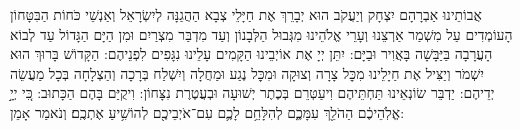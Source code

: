 \documentclass[a4paper, twoside, openany, parskip=half, 11pt]{article}
\begin{document}
אֲבוֹתֵינוּ אַבְרָהָם יִצְחָק וְיַעֲקֹב הוּא יְבָרֵךְ אֶת חַיָּלֵי צְבָא הַהֲגַנָּה לְיִשְׂרָאֵל וְאַנְשֵׁי כֹּחוֹת הַבִּטָּחוֹן הָעוֹמְדִים עַל מִשְׁמַר אַרְצֵנוּ וְעָרֵי אֱלֹהֵינוּ מִגְּבוּל הַלְּבָנוֹן וְעַד מִדְבַּר מִצְרַיִם וּמִן הַיָּם הַגָּדוֹל עַד לְבוֹא הָעֲרָבָה בַּיַּבָּשָׁה בָּאֲוִיר וּבַיָּם:
    יִתֵּן יְיָ אֶת אוֹיְבֵינוּ הַקָּמִים עָלֵינוּ נִגָּפִים לִפְנֵיהֶם: הַקָּדוֹשׁ בָּרוּךְ הוּא יִשְׁמֹר וְיַצִּיל אֶת חַיָלֵינוּ מִכׇּל צָרָה וְצוּקָה וּמִכׇּל נֶגַע וּמַחֲלָה וְיִשְׁלַח בְּרָכָה וְהַצְלָחָה בְּכָל מַעֲשֵׂה יְדֵיהֶם: יַדְבֵּר שׂוֹנְאֵינוּ תַּחְתֵּיהֶם וִיעַטְּרֵם בְּכֶתֶר יְשׁוּעָה וּבְעֲטֶרֶת נִצָּחוֹן: וִיקֻיַּם בָּהֶם הַכָּתוּב: כִּ֚י יְיָ֣ אֱלֹֽהֵיכֶ֔ם הַהֹלֵ֖ךְ עִמָּכֶ֑ם לְהִלָּחֵ֥ם לָכֶ֛ם עִם־אֹיְבֵיכֶ֖ם לְהוֹשִׁ֥יעַ אֶתְכֶֽם׃ 
 וְנֹאמַר אָמֵן:


\vfill

\end{document}
